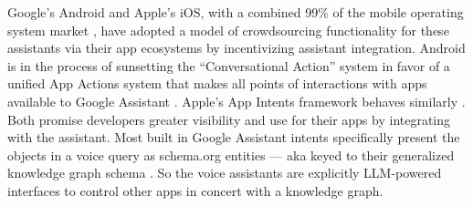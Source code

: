 \documentclass{article}
\begin{document}
Google's Android and Apple's iOS, with a combined 99\% of the mobile
operating system market \cite{statistaGlobalMobileOS2023} , have
adopted a model of crowdsourcing functionality for these assistants via
their app ecosystems by incentivizing assistant integration. Android is in the process of
sunsetting the ``Conversational Action'' system in favor of a unified
App Actions system that makes all points of interactions with apps
available to Google Assistant \cite{nathensonHelpingDevelopersCreate2022} . Apple's App Intents framework
behaves similarly \cite{appledeveloperdocumentationAppIntents} .
Both promise developers greater visibility and use for their apps by
integrating with the assistant. Most built in Google Assistant intents
specifically present the objects in a voice query as schema.org entities
--- aka keyed to their generalized knowledge graph schema \cite{androiddeveloperdocumentationBuildAppActions} . So the voice
assistants are explicitly LLM-powered interfaces to control other apps
in concert with a knowledge graph.
\end{document}

